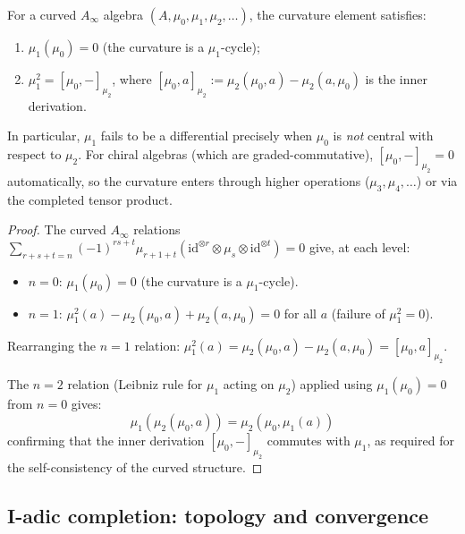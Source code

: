\begin{theorem}
\label{thm:curvature-central}
For a curved $A_\infty$ algebra $(A, \mu_0, \mu_1, \mu_2, \ldots)$, the curvature element satisfies:
\begin{enumerate}
\item $\mu_1(\mu_0) = 0$ \quad (the curvature is a $\mu_1$-cycle);
\item $\mu_1^2 = [\mu_0, -]_{\mu_2}$, where $[\mu_0, a]_{\mu_2} := \mu_2(\mu_0, a) - \mu_2(a, \mu_0)$ is the inner derivation.
\end{enumerate}
In particular, $\mu_1$ fails to be a differential precisely when $\mu_0$ is \emph{not} central with respect to $\mu_2$.  For chiral algebras (which are graded-commutative), $[\mu_0, -]_{\mu_2} = 0$ automatically, so the curvature enters through higher operations ($\mu_3, \mu_4, \ldots$) or via the completed tensor product.
\end{theorem}

\begin{proof}
The curved $A_\infty$ relations $\sum_{r+s+t=n}(-1)^{rs+t}\mu_{r+1+t}(\mathrm{id}^{\otimes r}\otimes \mu_s \otimes \mathrm{id}^{\otimes t})=0$ give, at each level:
\begin{itemize}
\item $n=0$: $\mu_1(\mu_0) = 0$ \quad (the curvature is a $\mu_1$-cycle).
\item $n=1$: $\mu_1^2(a) - \mu_2(\mu_0, a) + \mu_2(a, \mu_0) = 0$ for all $a$ \quad (failure of $\mu_1^2 = 0$).
\end{itemize}

Rearranging the $n=1$ relation: $\mu_1^2(a) = \mu_2(\mu_0, a) - \mu_2(a, \mu_0) = [\mu_0, a]_{\mu_2}$.

The $n=2$ relation (Leibniz rule for $\mu_1$ acting on $\mu_2$) applied using $\mu_1(\mu_0) = 0$ from $n=0$ gives:
\begin{equation}
\mu_1(\mu_2(\mu_0, a)) = \mu_2(\mu_0, \mu_1(a))
\end{equation}
confirming that the inner derivation $[\mu_0, -]_{\mu_2}$ commutes with $\mu_1$, as required for the self-consistency of the curved structure.
\end{proof}

\subsection{I-adic completion: topology and convergence}
\label{sec:i-adic-completion}

